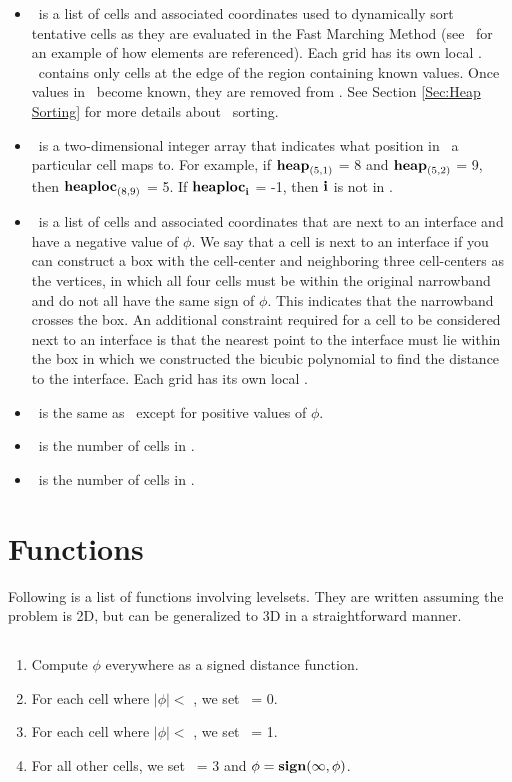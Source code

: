 \begin{itemize}
\item \heap~is a list of cells and associated coordinates used to dynamically sort tentative cells as they are evaluated in the Fast Marching Method (see \nband~for an example of how elements are referenced).  Each grid has its own local \heap.  \heap~contains only cells at the edge of the region containing known values.  Once values in \heap~become known, they are removed from \heap.  See Section \ref{Sec:Heap Sorting} for more details about \heap~sorting.

\item \heaploc~is a two-dimensional integer array that indicates what position in \heap~a particular cell maps to.  For example, if ${\tt{\bf heap}}_{(5,1)}$ = 8 and ${\tt{\bf heap}}_{(5,2)}$ = 9, then ${\tt{\bf heaploc}}_{(8,9)}$ = 5.  If ${\tt{\bf heaploc}}_{\bf i}$ = -1, then ${\bf i}$ is not in \heap.

\item \intfacen~is a list of cells and associated coordinates that are next to an interface and have a negative value of $\phi$.  We say that a cell is next to an interface if you can construct a box with the cell-center and neighboring three cell-centers as the vertices, in which all four cells must be within the original narrowband and do not all have the same sign of $\phi$.  This indicates that the narrowband crosses the box.  An additional constraint required for a cell to be considered next to an interface is that the nearest point to the interface must lie within the box in which we constructed the bicubic polynomial to find the distance to the interface.  Each grid has its own local \intfacen.

\item \intfacep~is the same as \intfacen~except for positive values of $\phi$.

\item \intfacenumn~is the number of cells in \intfacen.

\item \intfacenump~is the number of cells in \intfacep.

\end{itemize}

\section{Functions}
Following is a list of functions involving levelsets.  They are written assuming the problem is 2D, but can be generalized to 3D in a straightforward manner.
\subsection{\INITPHI}
\begin{enumerate}
\item Compute $\phi$ everywhere as a signed distance function.
\item For each cell where $|\phi| <$ \mineloc, we set \type~= 0.
\item For each cell where $|\phi| <$ \nbandwidth, we set \type~= 1.
\item For all other cells, we set \type~= 3 and $\phi = {\tt{\bf sign}}(\infty,\phi)$.
\end{enumerate}
